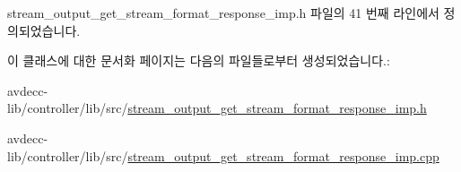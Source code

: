 stream\+\_\+output\+\_\+get\+\_\+stream\+\_\+format\+\_\+response\+\_\+imp.\+h 파일의 41 번째 라인에서 정의되었습니다.



이 클래스에 대한 문서화 페이지는 다음의 파일들로부터 생성되었습니다.\+:\begin{DoxyCompactItemize}
\item 
avdecc-\/lib/controller/lib/src/\hyperlink{stream__output__get__stream__format__response__imp_8h}{stream\+\_\+output\+\_\+get\+\_\+stream\+\_\+format\+\_\+response\+\_\+imp.\+h}\item 
avdecc-\/lib/controller/lib/src/\hyperlink{stream__output__get__stream__format__response__imp_8cpp}{stream\+\_\+output\+\_\+get\+\_\+stream\+\_\+format\+\_\+response\+\_\+imp.\+cpp}\end{DoxyCompactItemize}

